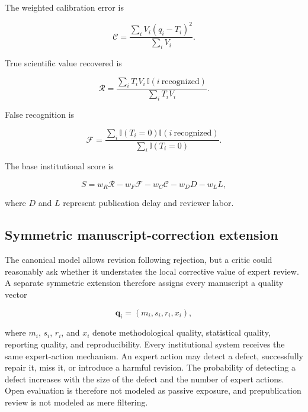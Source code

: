 \documentclass[11pt]{article}
\begin{document}
The weighted calibration error is

\begin{equation}
\mathcal{C}
=
\frac{\sum_i V_i(q_i-T_i)^2}{\sum_i V_i}.
\end{equation}

True scientific value recovered is

\begin{equation}
\mathcal{R}
=
\frac{\sum_i T_iV_i\,\mathbb{I}(i\ \mathrm{recognized})}
{\sum_i T_iV_i}.
\end{equation}

False recognition is

\begin{equation}
\mathcal{F}
=
\frac{\sum_i \mathbb{I}(T_i=0)\mathbb{I}(i\ \mathrm{recognized})}
{\sum_i \mathbb{I}(T_i=0)}.
\end{equation}

The base institutional score is

\begin{equation}
S
=w_R\mathcal{R}
-w_F\mathcal{F}
-w_C\mathcal{C}
-w_D D
-w_L L,
\end{equation}

where $D$ and $L$ represent publication delay and reviewer labor.


\subsection{Symmetric manuscript-correction extension}

The canonical model allows revision following rejection, but a critic could reasonably ask whether it understates the local corrective value of expert review. A separate symmetric extension therefore assigns every manuscript a quality vector

\begin{equation}
\mathbf{q}_i=(m_i,s_i,r_i,x_i),
\end{equation}

where $m_i$, $s_i$, $r_i$, and $x_i$ denote methodological quality, statistical quality, reporting quality, and reproducibility. Every institutional system receives the same expert-action mechanism. An expert action may detect a defect, successfully repair it, miss it, or introduce a harmful revision. The probability of detecting a defect increases with the size of the defect and the number of expert actions. Open evaluation is therefore not modeled as passive exposure, and prepublication review is not modeled as mere filtering.
\end{document}

